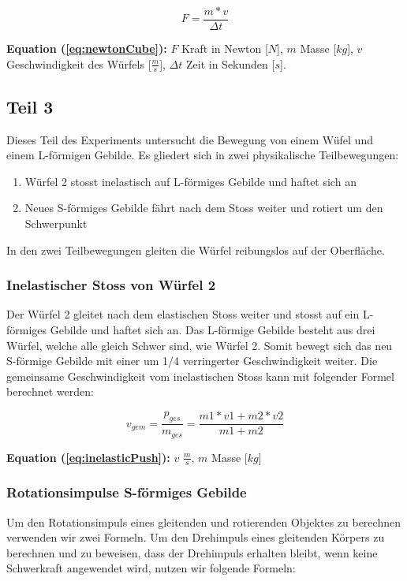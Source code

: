 \documentclass{article}
\begin{document}
\begin{equation}\label{eq:newtonCube}
F = \frac{m * v}{\Delta t}
\end{equation}

\scriptsize
\textbf{Equation (\ref{eq:newtonCube}):} $F$ Kraft in Newton [$N$], $m$ Masse [$kg$], $v$ Geschwindigkeit des Würfels [$\frac{m}{s}$], $\Delta t$ Zeit in Sekunden [$s$].
\normalsize
\medskip

\newpage

\subsection{Teil 3}
Dieses Teil des Experiments untersucht die Bewegung von einem Wüfel und einem L-förmigen Gebilde. Es gliedert sich in zwei physikalische Teilbewegungen:

\begin{enumerate}
    \item Würfel 2 stosst inelastisch auf L-förmiges Gebilde und haftet sich an
    \item Neues S-förmiges Gebilde fährt nach dem Stoss weiter und rotiert um den Schwerpunkt
\end{enumerate}
In den zwei Teilbewegungen gleiten die Würfel reibungslos auf der Oberfläche.
\subsubsection{Inelastischer Stoss von Würfel 2}
Der Würfel 2 gleitet nach dem elastischen Stoss weiter und stosst auf ein L-förmiges Gebilde und haftet sich an. Das L-förmige Gebilde besteht aus drei Würfel, welche alle gleich Schwer sind, wie Würfel 2. Somit bewegt sich das neu S-förmige Gebilde mit einer um 1/4 verringerter Geschwindigkeit weiter. Die gemeinsame Geschwindigkeit vom inelastischen Stoss kann mit folgender Formel berechnet werden:

\begin{equation}\label{eq:inelasticPush}
v_{gem} = \frac{p_{ges}}{m_{ges}} = \frac{m1*v1 + m2*v2}{m1 + m2}
\end{equation}

\scriptsize
\textbf{Equation (\ref{eq:inelasticPush}):} $v$ $\frac{m}{s}$, $m$ Masse [$kg$]
\subsubsection{Rotationsimpulse S-förmiges Gebilde}
\normalsize
\medskip
Um den Rotationsimpuls eines gleitenden und rotierenden Objektes zu berechnen verwenden wir zwei Formeln. Um den Drehimpuls eines gleitenden Körpers zu berechnen und zu beweisen, dass der Drehimpuls erhalten bleibt, wenn keine Schwerkraft angewendet wird, nutzen wir folgende Formeln:
\end{document}
